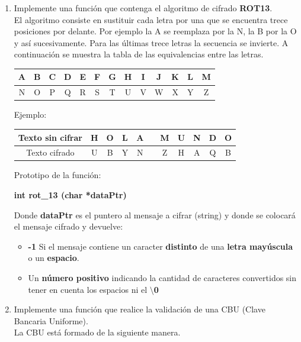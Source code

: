 \documentclass[12pt]{article} %
\begin{document}
\begin{enumerate}
\item Implemente una función que contenga el algoritmo de cifrado {\bf ROT13}. \\
El algoritmo consiste en sustituir cada letra por una que se encuentra trece posiciones por delante. Por ejemplo la A se reemplaza por la N, la B por la O y así sucesivamente. Para las últimas trece letras la secuencia se invierte. A continuación se muestra la tabla de las equivalencias entre las letras.
\noindent
  \begin{center}
   \begin{tabular}{| c | c | c | c | c | c | c | c | c | c | c | c | c |}
    \hline
     A & B & C & D & E & F & G & H & I & J & K & L & M \\ \hline 
     N & O & P & Q & R & S & T & U & V & W & X & Y & Z \\ \hline 
   \end{tabular}	
  \end{center}
Ejemplo:
\noindent
\vspace{-0.6cm}
  \begin{center}
   \begin{tabular}{| c | c | c | c | c | c | c | c | c | c | c |}
    \hline
     Texto sin cifrar & H & O & L & A &   & M & U & N & D & O  \\ \hline 
     Texto cifrado    & U & B & Y & N &   & Z & H & A & Q & B  \\ \hline 
   \end{tabular}	
  \end{center}
Prototipo de la función:
\begin{center}
{\bf int rot\_13 (char *dataPtr)}
\end{center}
Donde {\bf dataPtr} es el puntero al mensaje a cifrar (string) y donde se colocará el mensaje cifrado y devuelve:
\begin{itemize}
\item {\bf -1} Si el mensaje contiene un caracter {\bf distinto} de una {\bf letra mayúscula} o un {\bf espacio}.
\item Un {\bf número positivo} indicando la cantidad de caracteres convertidos sin tener en 
cuenta los espacios ni el {\bf $\setminus$0}
\end{itemize}
\item Implemente una función que realice la validación de una CBU (Clave Bancaria Uniforme).\\
La CBU está formado de la siguiente manera.\\

\end{enumerate}
\end{document}
